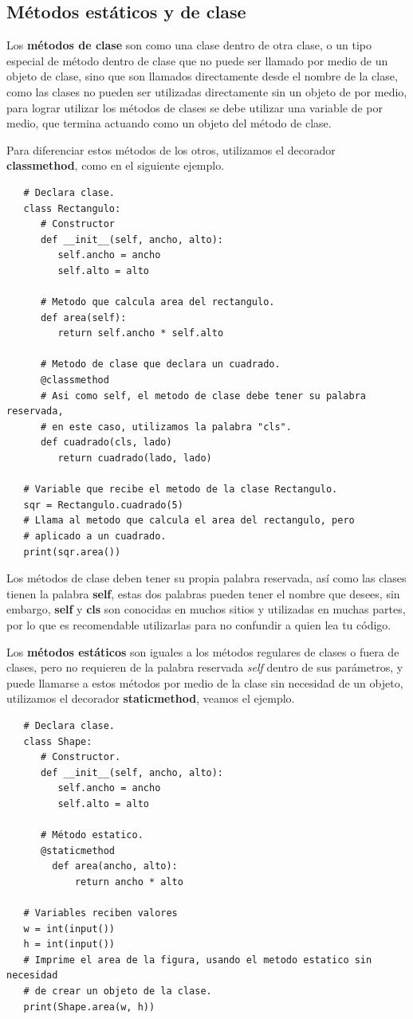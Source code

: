 \subsection{Métodos estáticos y de clase}
\hspace{0.55cm}Los \textbf{métodos de clase} son como una clase dentro de otra clase, o un tipo especial de método dentro de clase que no puede ser llamado por medio de un objeto de clase, sino que son llamados directamente desde el nombre de la clase, como las clases no pueden ser utilizadas directamente sin un objeto de por medio, para lograr utilizar los métodos de clases se debe utilizar una variable de por medio, que termina actuando como un objeto del método de clase.

Para diferenciar estos métodos de los otros, utilizamos el decorador \textbf{classmethod}, como en el siguiente ejemplo.
\begin{lstlisting}
   # Declara clase.
   class Rectangulo:
      # Constructor
      def __init__(self, ancho, alto):
         self.ancho = ancho
         self.alto = alto
      
      # Metodo que calcula area del rectangulo.
      def area(self):
         return self.ancho * self.alto
      
      # Metodo de clase que declara un cuadrado.
      @classmethod
      # Asi como self, el metodo de clase debe tener su palabra reservada,
      # en este caso, utilizamos la palabra "cls".
      def cuadrado(cls, lado)
         return cuadrado(lado, lado)
      
   # Variable que recibe el metodo de la clase Rectangulo.
   sqr = Rectangulo.cuadrado(5)
   # Llama al metodo que calcula el area del rectangulo, pero
   # aplicado a un cuadrado.
   print(sqr.area())
\end{lstlisting}

Los métodos de clase deben tener su propia palabra reservada, así como las clases tienen la palabra \textbf{self}, estas dos palabras pueden tener el nombre que desees, sin embargo, \textbf{self} y \textbf{cls} son conocidas en muchos sitios y utilizadas en muchas partes, por lo que es recomendable utilizarlas para no confundir a quien lea tu código.

Los \textbf{métodos estáticos} son iguales a los métodos regulares de clases o fuera de clases, pero no requieren de la palabra reservada \textit{self} dentro de sus parámetros, y puede llamarse a estos métodos por medio de la clase sin necesidad de un objeto, utilizamos el decorador \textbf{staticmethod}, veamos el ejemplo.
\begin{lstlisting}
   # Declara clase.
   class Shape:
      # Constructor.
      def __init__(self, ancho, alto):
         self.ancho = ancho
         self.alto = alto
    
	  # Método estatico.
      @staticmethod
      	def area(ancho, alto):
         	return ancho * alto

   # Variables reciben valores
   w = int(input())
   h = int(input())
   # Imprime el area de la figura, usando el metodo estatico sin necesidad
   # de crear un objeto de la clase.
   print(Shape.area(w, h))
\end{lstlisting}


